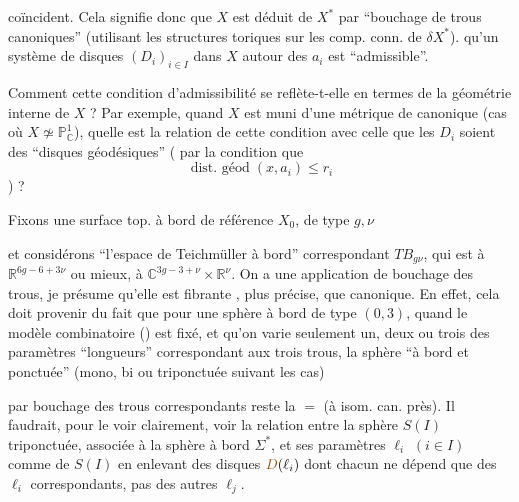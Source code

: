 coïncident. Cela signifie donc que
$X$ est déduit de $X^*$ par ``bouchage
de trous  canoniques'' (utilisant
les structures toriques sur les
comp. conn. de $\delta X^*$). 
qu'un système de disques $(D_i)_{i\in I}$ dans $X$
 autour des $a_i$ est ``admissible''.

\uline{} Comment cette condition
d'admissibilité se reflète-t-elle en
termes de la géométrie interne de $X$ ?
Par exemple,  quand $X$ est muni
d'une métrique de  canonique
(cas où $X\not\simeq\mathbb P^1_{\mathbb C}$), quelle est la
relation de cette condition avec celle
que les \deleted{$\unsure{\delta}$}$D_i$ soient des ``disques
géodésiques'' ( par la condition que
\[
\operatorname{\text{dist. géod}}(x,a_i)\leq r_i
\]
) ?

Fixons une  surface top. 
à bord de référence $X_0$, de type $g,\nu$

et considérons ``l'espace de
Teichmüller à bord'' correspondant
 $TB_{g\nu}$, qui est  à $\mathbb R^{6g-6+3\nu}$
ou mieux, à $\mathbb C^{3g-3+\nu}\times\mathbb R^\nu$. On a une
application
de bouchage des trous, je présume
qu'elle est fibrante ,
plus précise, que 
canonique.  En effet, cela doit
provenir du fait que pour une
sphère à bord  de type $(0,3)$, 
quand le modèle combinatoire
() est fixé, et
qu'on varie seulement  un, deux
ou trois des paramètres ``longueurs''
correspondant aux trois trous, la
sphère ``à bord et ponctuée'' (mono, bi ou
triponctuée suivant les cas) 

par bouchage des trous correspondants reste
la $=$ (à isom. can. près). Il faudrait,
pour le voir clairement, voir la
relation entre la sphère  $S(I)$ triponctuée,
associée à la sphère à bord $\Sigma^*$, et ses
paramètres $\ell_i$ $(i\in I)$ comme 
de $S(I)$ en enlevant des disques 
$\unsure{D}(\ell_i)$  dont chacun ne dépend que
des $\ell_i$ correspondants, pas des autres
$\ell_j$.

